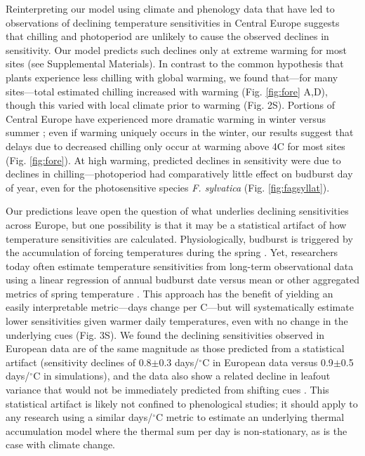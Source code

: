 \documentclass{article}
\begin{document}
\par Reinterpreting our model using climate and phenology data that have led to observations of declining temperature sensitivities in Central Europe suggests that chilling and photoperiod are unlikely to cause the observed declines in sensitivity. Our model predicts such declines only at extreme warming for most sites (see Supplemental Materials). In contrast to the common hypothesis that plants experience less chilling with global warming, we found that---for many sites---total estimated chilling increased with warming (Fig. \ref{fig:fore} A,D), though this varied with local climate prior to warming (Fig. 2S). 
Portions of Central Europe have experienced more dramatic warming in winter versus summer \citep{balling1998}; even if warming uniquely occurs in the winter, our results suggest that delays due to decreased chilling only occur at warming above 4\degree C for most sites (Fig. \ref{fig:fore}). At high warming, predicted declines in sensitivity were due to declines in chilling---photoperiod had comparatively little effect on budburst day of year, even for the photosensitive species \emph{F. sylvatica} (Fig. \ref{fig:fagsyllat}). 

\par Our predictions leave open the question of what underlies declining sensitivities across Europe, but one possibility is that it may be a statistical artifact of how temperature sensitivities are calculated.
Physiologically, budburst is triggered by the accumulation of forcing temperatures during the spring \citep{hanninen1995,chuine2016}. Yet, researchers today often estimate temperature sensitivities from long-term observational data using a linear regression of annual budburst date versus mean or other aggregated metrics of spring temperature \citep[e.g.,][]{Wolkovich:2012n}. This approach has the benefit of yielding an easily interpretable metric---days change per \degree C---but will systematically estimate lower sensitivities given warmer daily temperatures, even with no change in the underlying cues (Fig. 3S). We found the declining sensitivities observed in European data are of the same magnitude as those predicted from a statistical artifact (sensitivity declines of 0.8$\pm$0.3 days/$^{\circ}$C in European data versus 0.9$\pm$0.5 days/$^{\circ}$C in simulations), and the data also show a related decline in leafout variance that would not be immediately predicted from shifting cues \citep[see \emph{Potential statistical artifacts in declines of temperature sensitivity observational long-term data} in the Supplemental Materials and ][for further details]{gusewell2017}. This statistical artifact is likely not confined to phenological studies; it should apply to any research using a similar days/$^{\circ}$C metric to estimate an underlying thermal accumulation model where the thermal sum per day is non-stationary, as is the case with climate change. 
\end{document}

